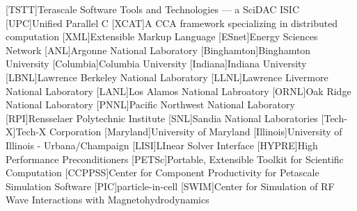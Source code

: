 \begin{acronym}
[TSTT]{Terascale Software Tools and Technologies --- a SciDAC ISIC}
[UPC]{Unified Parallel C}
[XCAT]{A CCA framework specializing in distributed computation}
[XML]{Extensible Markup Language}
[ESnet]{Energy Sciences Network}
[ANL]{Argonne National Laboratory}
[Binghamton]{Binghamton University}
[Columbia]{Columbia University}
[Indiana]{Indiana University}
[LBNL]{Lawrence Berkeley National Laboratory}
[LLNL]{Lawrence Livermore National Laboratory}
[LANL]{Los Alamos National Labroatory}
[ORNL]{Oak Ridge National Laboratory}
[PNNL]{Pacific Northwest National Laboratory}
[RPI]{Rensselaer Polytechnic Institute}
[SNL]{Sandia National Laboratories}
[Tech-X]{Tech-X Corporation}
[Maryland]{University of Maryland}
[Illinois]{University of Illinois - Urbana/Champaign}
[LISI]{LInear Solver Interface}
[HYPRE]{High Performance Preconditioners}
[PETSc]{Portable, Extensible Toolkit for Scientific Computation}
[CCPPSS]{Center for Component Productivity for Petascale Simulation Software}
[PIC]{particle-in-cell}
[SWIM]{Center for Simulation of RF Wave Interactions with Magnetohydrodynamics}

\end{acronym}

